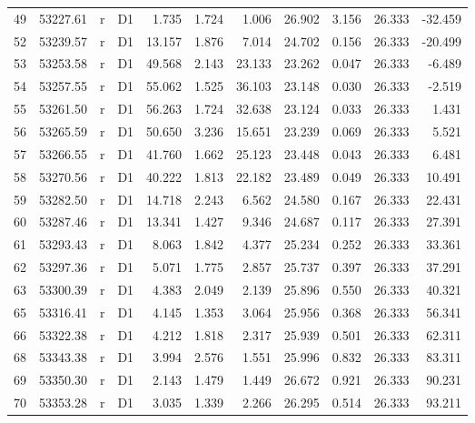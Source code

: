 \begin{tabular}{lrllrrrrrrr}
49 &  53227.61 &   r &    D1 &    1.735 &       1.724 &   1.006 &  26.902 &   3.156 &  26.333 &  -32.459 \\
52 &  53239.57 &   r &    D1 &   13.157 &       1.876 &   7.014 &  24.702 &   0.156 &  26.333 &  -20.499 \\
53 &  53253.58 &   r &    D1 &   49.568 &       2.143 &  23.133 &  23.262 &   0.047 &  26.333 &   -6.489 \\
54 &  53257.55 &   r &    D1 &   55.062 &       1.525 &  36.103 &  23.148 &   0.030 &  26.333 &   -2.519 \\
55 &  53261.50 &   r &    D1 &   56.263 &       1.724 &  32.638 &  23.124 &   0.033 &  26.333 &    1.431 \\
56 &  53265.59 &   r &    D1 &   50.650 &       3.236 &  15.651 &  23.239 &   0.069 &  26.333 &    5.521 \\
57 &  53266.55 &   r &    D1 &   41.760 &       1.662 &  25.123 &  23.448 &   0.043 &  26.333 &    6.481 \\
58 &  53270.56 &   r &    D1 &   40.222 &       1.813 &  22.182 &  23.489 &   0.049 &  26.333 &   10.491 \\
59 &  53282.50 &   r &    D1 &   14.718 &       2.243 &   6.562 &  24.580 &   0.167 &  26.333 &   22.431 \\
60 &  53287.46 &   r &    D1 &   13.341 &       1.427 &   9.346 &  24.687 &   0.117 &  26.333 &   27.391 \\
61 &  53293.43 &   r &    D1 &    8.063 &       1.842 &   4.377 &  25.234 &   0.252 &  26.333 &   33.361 \\
62 &  53297.36 &   r &    D1 &    5.071 &       1.775 &   2.857 &  25.737 &   0.397 &  26.333 &   37.291 \\
63 &  53300.39 &   r &    D1 &    4.383 &       2.049 &   2.139 &  25.896 &   0.550 &  26.333 &   40.321 \\
65 &  53316.41 &   r &    D1 &    4.145 &       1.353 &   3.064 &  25.956 &   0.368 &  26.333 &   56.341 \\
66 &  53322.38 &   r &    D1 &    4.212 &       1.818 &   2.317 &  25.939 &   0.501 &  26.333 &   62.311 \\
68 &  53343.38 &   r &    D1 &    3.994 &       2.576 &   1.551 &  25.996 &   0.832 &  26.333 &   83.311 \\
69 &  53350.30 &   r &    D1 &    2.143 &       1.479 &   1.449 &  26.672 &   0.921 &  26.333 &   90.231 \\
70 &  53353.28 &   r &    D1 &    3.035 &       1.339 &   2.266 &  26.295 &   0.514 &  26.333 &   93.211 \\

\end{tabular}
